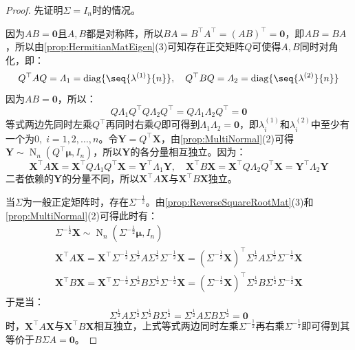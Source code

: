 \begin{proof}
	先证明$\Sigma=I_n$时的情况。\par
	因为$AB=\mathbf{0}$且$A,B$都是对称阵，所以$BA=B^{\top}A^{\top}=(AB)^{\top}=\mathbf{0}$，即$AB=BA$，所以由\cref{prop:HermitianMatEigen}(3)可知存在正交矩阵$Q$可使得$A,B$同时对角化，即：
	\begin{equation*}
		Q^{\top}AQ=\varLambda_1=\operatorname{diag}\{\seq{\lambda^{(1)}}{n}\},\quad Q^{\top}BQ=\varLambda_2=\operatorname{diag}\{\seq{\lambda^{(2)}}{n}\}
	\end{equation*}
	因为$AB=\mathbf{0}$，所以：
	\begin{equation*}
		Q\varLambda_1Q^{\top}Q\varLambda_2Q^{\top}=Q\varLambda_1\varLambda_2Q^{\top}=\mathbf{0}
	\end{equation*}
	等式两边先同时左乘$Q^{\top}$再同时右乘$Q$即可得到$\varLambda_1\varLambda_2=\mathbf{0}$，即$\lambda_i^{(1)}$和$\lambda_i^{(2)}$中至少有一个为$0,\;i=1,2,\dots,n$。令$\mathbf{Y}=Q^{\top}\mathbf{X}$，由\cref{prop:MultiNormal}(2)可得$\mathbf{Y}\sim\operatorname{N}_n(Q^{\top}\boldsymbol{\mu},I_n)$，所以$\mathbf{Y}$的各分量相互独立。因为：
	\begin{equation*}
		\mathbf{X}^{\top}A\mathbf{X}=\mathbf{X}^{\top}Q\varLambda_1Q^{\top}\mathbf{X}=\mathbf{Y}^{\top}\varLambda_1\mathbf{Y},\quad\mathbf{X}^{\top}B\mathbf{X}=\mathbf{X}^{\top}Q\varLambda_2Q^{\top}\mathbf{X}=\mathbf{Y}^{\top}\varLambda_2\mathbf{Y}
	\end{equation*}
	二者依赖的$\mathbf{Y}$的分量不同，所以$\mathbf{X}^{\top}A\mathbf{X}$与$\mathbf{X}^{\top}B\mathbf{X}$独立。\par
	当$\Sigma$为一般正定矩阵时，存在$\Sigma^{-\frac{1}{2}}$。由\cref{prop:ReverseSquareRootMat}(3)和\cref{prop:MultiNormal}(2)可得此时有：
	\begin{gather*}
		\Sigma^{-\frac{1}{2}}\mathbf{X}\sim\operatorname{N}_n(\Sigma^{-\frac{1}{2}}\boldsymbol{\mu},I_n) \\
		\mathbf{X}^{\top}A\mathbf{X}=\mathbf{X}^{\top}\Sigma^{-\frac{1}{2}}\Sigma^{\frac{1}{2}}A\Sigma^{\frac{1}{2}}\Sigma^{-\frac{1}{2}}\mathbf{X}=(\Sigma^{-\frac{1}{2}}\mathbf{X})^{\top}\Sigma^{\frac{1}{2}}A\Sigma^{\frac{1}{2}}\Sigma^{-\frac{1}{2}}\mathbf{X} \\
		\mathbf{X}^{\top}B\mathbf{X}=\mathbf{X}^{\top}\Sigma^{-\frac{1}{2}}\Sigma^{\frac{1}{2}}B\Sigma^{\frac{1}{2}}\Sigma^{-\frac{1}{2}}\mathbf{X}=(\Sigma^{-\frac{1}{2}}\mathbf{X})^{\top}\Sigma^{\frac{1}{2}}B\Sigma^{\frac{1}{2}}\Sigma^{-\frac{1}{2}}\mathbf{X}
	\end{gather*}
	于是当：
	\begin{equation*}
		\Sigma^{\frac{1}{2}}A\Sigma^{\frac{1}{2}}\Sigma^{\frac{1}{2}}B\Sigma^{\frac{1}{2}}=\Sigma^{\frac{1}{2}}A\Sigma B\Sigma^{\frac{1}{2}}=\mathbf{0}
	\end{equation*}
	时，$\mathbf{X}^{\top}A\mathbf{X}$与$\mathbf{X}^{\top}B\mathbf{X}$相互独立，上式等式两边同时左乘$\Sigma^{-\frac{1}{2}}$再右乘$\Sigma^{-\frac{1}{2}}$即可得到其等价于$B\Sigma A=\mathbf{0}$。
\end{proof}

